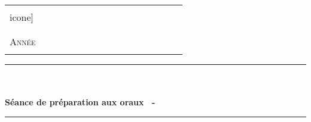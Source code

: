 %
%



  \begin{center} %


	\begin{center}
		\begin{tabular}{p{0.2\linewidth}p{0.6\linewidth}}
			\begin{minipage}{\linewidth}
				\begin{center}
					\texttt{[image: \\icone]}\\[0.5cm]
				\end{center}
			\end{minipage}
		&

			\begin{minipage}{\linewidth}
				\begin{center}
					\textsc{\LARGE \etablissement}\\[1cm]
    
					\textsc{\Large \classe}\\[0.5cm]

					\textsc{\Large Année \annee}\\[1cm]
				\end{center}
			\end{minipage}
		\end{tabular}
	\end{center}
	\vspace{0.6cm}

    
    \rule{\linewidth}{0.5mm}\\[0.4cm]

    {\textsc{\partie}}\\[0.4cm]

    { \huge \bfseries Séance de préparation aux oraux \numero\ - \titre }\\[0.4cm]

    \rule{\linewidth}{0.5mm}\\[1cm]


  \end{center}	%



